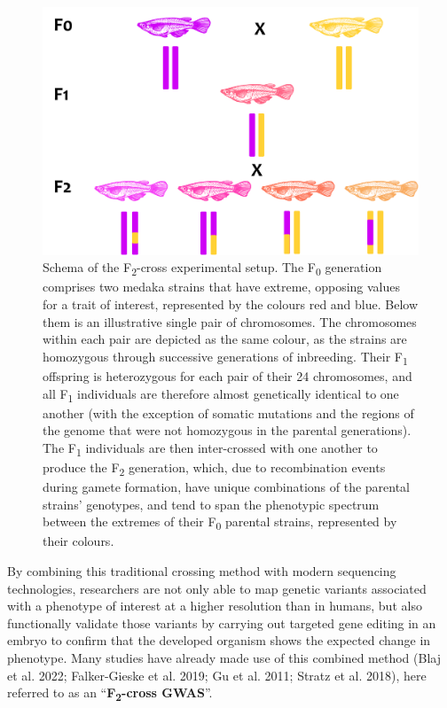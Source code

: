 \documentclass[
]{book}
\begin{document}
\begin{figure}
\includegraphics[width=1\linewidth]{figs/mikk_behaviour/F2-cross-schema} \caption{Schema of the F\textsubscript{2}-cross experimental setup. The F\textsubscript{0} generation comprises two medaka strains that have extreme, opposing values for a trait of interest, represented by the colours red and blue. Below them is an illustrative single pair of chromosomes. The chromosomes within each pair are depicted as the same colour, as the strains are homozygous through successive generations of inbreeding. Their F\textsubscript{1} offspring is heterozygous for each pair of their 24 chromosomes, and all F\textsubscript{1} individuals are therefore almost genetically identical to one another (with the exception of somatic mutations and the regions of the genome that were not homozygous in the parental generations). The F\textsubscript{1} individuals are then inter-crossed with one another to produce the F\textsubscript{2} generation, which, due to recombination events during gamete formation, have unique combinations of the parental strains' genotypes, and tend to span the phenotypic spectrum between the extremes of their F\textsubscript{0} parental strains, represented by their colours.}\label{fig:F2-cross-schema}
\end{figure}

By combining this traditional crossing method with modern sequencing technologies, researchers are not only able to map genetic variants associated with a phenotype of interest at a higher resolution than in humans, but also functionally validate those variants by carrying out targeted gene editing in an embryo to confirm that the developed organism shows the expected change in phenotype. Many studies have already made use of this combined method (Blaj et al. 2022; Falker-Gieske et al. 2019; Gu et al. 2011; Stratz et al. 2018), here referred to as an ``\textbf{F\textsubscript{2}-cross GWAS}''.
\end{document}

